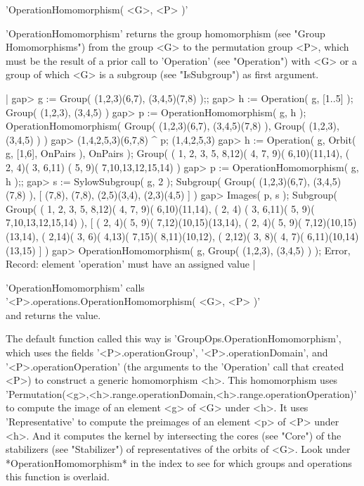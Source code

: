 
'OperationHomomorphism( <G>, <P> )'

'OperationHomomorphism'  returns  the  group  homomorphism  (see   "Group
Homomorphisms") from  the group <G> to the  permutation group <P>,  which
must be the result of a prior call to 'Operation' (see  "Operation") with
<G>  or a group of which <G>  is a  subgroup (see "IsSubgroup") as  first
argument.

|    gap> g := Group( (1,2,3)(6,7), (3,4,5)(7,8) );;
    gap> h := Operation( g, [1..5] );
    Group( (1,2,3), (3,4,5) )
    gap> p := OperationHomomorphism( g, h );
    OperationHomomorphism( Group( (1,2,3)(6,7), (3,4,5)(7,8) ), Group(
    (1,2,3), (3,4,5) ) )
    gap> (1,4,2,5,3)(6,7,8) ^ p;
    (1,4,2,5,3)
    gap> h := Operation( g, Orbit( g, [1,6], OnPairs ), OnPairs );
    Group( ( 1, 2, 3, 5, 8,12)( 4, 7, 9)( 6,10)(11,14), ( 2, 4)( 3, 6,11)
    ( 5, 9)( 7,10,13,12,15,14) )
    gap> p := OperationHomomorphism( g, h );;
    gap> s := SylowSubgroup( g, 2 );
    Subgroup( Group( (1,2,3)(6,7), (3,4,5)(7,8) ),
    [ (7,8), (7,8), (2,5)(3,4), (2,3)(4,5) ] )
    gap> Images( p, s );
    Subgroup( Group( ( 1, 2, 3, 5, 8,12)( 4, 7, 9)( 6,10)(11,14), ( 2, 4)
    ( 3, 6,11)( 5, 9)( 7,10,13,12,15,14) ),
    [ ( 2, 4)( 5, 9)( 7,12)(10,15)(13,14),
      ( 2, 4)( 5, 9)( 7,12)(10,15)(13,14),
      ( 2,14)( 3, 6)( 4,13)( 7,15)( 8,11)(10,12),
      ( 2,12)( 3, 8)( 4, 7)( 6,11)(10,14)(13,15) ] )
    gap> OperationHomomorphism( g, Group( (1,2,3), (3,4,5) ) );
    Error, Record: element 'operation' must have an assigned value |

'OperationHomomorphism' calls \\
'<P>.operations.OperationHomomorphism( <G>, <P> )' \\
and returns the value.

The default function called this way is 'GroupOps.OperationHomomorphism',
which uses  the  fields  '<P>.operationGroup', '<P>.operationDomain', and
'<P>.operationOperation'  (the arguments  to  the  'Operation' call  that
created    <P>)   to  construct     a  generic   homomorphism  <h>.  This
homomorphism uses \\
'Permutation(<g>,<h>.range.operationDomain,<h>.range.operationOperation)'
\\
to  compute  the image  of an element  <g>  of  <G>  under  <h>.  It uses
'Representative' to compute the preimages  of an element <p> of <P> under
<h>.  And it computes  the kernel by intersecting  the cores (see "Core")
of the stabilizers (see "Stabilizer") of representatives of the orbits of
<G>.  Look  under  *OperationHomomorphism* in the index  to see for which
groups and operations this function is overlaid.

